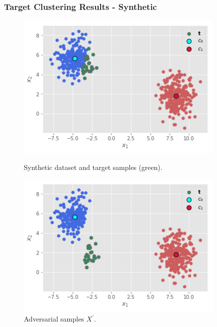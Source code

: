 \documentclass{beamer}
\begin{document}
\begin{frame}
	\frametitle{Target Clustering Results - Synthetic}
	   	
	\begin{figure}[H]
   		\begin{minipage}[t]{0.45\linewidth}
   			\centering
   			\includegraphics[width=0.9\textwidth]{img/target/XsyntheticTargets.png}
   			\caption{\footnotesize Synthetic dataset and target samples (green).}
   		\end{minipage}        
   		\hspace{.1cm}
   		\begin{minipage}[t]{0.45\linewidth}
   			\centering
   			\includegraphics[width=0.9\textwidth]{img/target/XsyntheticAdv.png}
   			\caption{\footnotesize Adversarial samples $X^\prime$.}
   		\end{minipage}
   	\end{figure}
	\begin{figure}[H]

\end{figure}
\end{frame}
\end{document}
